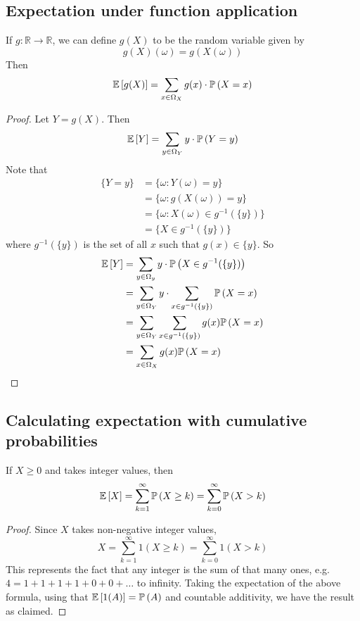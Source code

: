 \subsection{Expectation under function application}
If \(g \colon \mathbb R \to \mathbb R\), we can define \(g(X)\) to be the random variable given by
\[
	g(X)(\omega) = g(X(\omega))
\]
Then
\[
	\mathbb{E}\left[{g(X)}\right] = \sum_{x \in \Omega_X} g(x) \cdot \mathbb{P}\left({X = x}\right)
\]
\begin{proof}
	Let \(Y = g(X)\).
	Then
	\[
		\mathbb{E}\left[{Y}\right] = \sum_{y \in \Omega_Y} y \cdot \mathbb{P}\left({Y = y}\right)
	\]
	Note that
	\begin{align*}
		\{ Y = y \} & = \{ \omega \colon Y(\omega) = y \}              \\
		            & = \{ \omega \colon g(X(\omega)) = y \}           \\
		            & = \{ \omega \colon X(\omega) \in g^{-1}(\{y\})\} \\
		            & = \{ X \in g^{-1} (\{ y \}) \}
	\end{align*}
	where \(g^{-1}(\{ y \})\) is the set of all \(x\) such that \(g(x) \in \{ y \}\).
	So
	\begin{align*}
		\mathbb{E}\left[{Y}\right] & = \sum_{y \in \Omega_y} y \cdot \mathbb{P}\left({X \in g^{-1}(\{ y \})}\right)              \\
		           & = \sum_{y \in \Omega_Y} y \cdot \sum_{x \in g^{-1}(\{ y \})} \mathbb{P}\left({X = x}\right) \\
		           & = \sum_{y \in \Omega_Y} \sum_{x \in g^{-1}(\{y\})} g(x) \mathbb{P}\left({X = x}\right)      \\
		           & = \sum_{x \in \Omega_X} g(x) \mathbb{P}\left({X = x}\right)
	\end{align*}
\end{proof}

\subsection{Calculating expectation with cumulative probabilities}
If \(X \geq 0\) and takes integer values, then
\[
	\mathbb{E}\left[{X}\right] = \sum_{k=1}^\infty \mathbb{P}\left({X \geq k}\right) = \sum_{k=0}^\infty \mathbb{P}\left({X > k}\right)
\]
\begin{proof}
	Since \(X\) takes non-negative integer values,
	\[
		X = \sum_{k=1}^\infty 1(X \geq k) = \sum_{k=0}^\infty 1(X > k)
	\]
	This represents the fact that any integer is the sum of that many ones, e.g.
	\(4 = 1 + 1 + 1 + 1 + 0 + 0 + \dots\) to infinity.
	Taking the expectation of the above formula, using that \(\mathbb{E}\left[{1(A)}\right] = \mathbb{P}\left({A}\right)\) and countable additivity, we have the result as claimed.
\end{proof}

